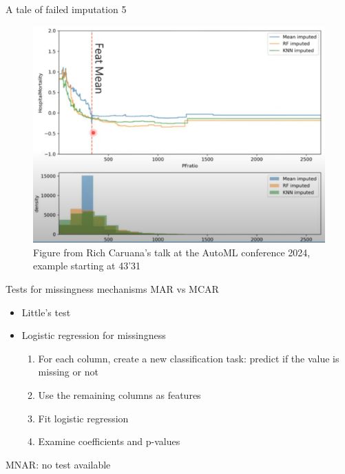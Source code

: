 \documentclass[11pt,compress,t,notes=noshow, aspectratio=169, xcolor=table]{beamer}
\begin{document}
\begin{frame}{A tale of failed imputation 5}
\vfill
\begin{figure}
    \centering
    \includegraphics[width=0.5\linewidth]{slides/07_imputation/figure_man/Screenshot from 2025-06-03 22-39-01.png}
    \caption{Figure from Rich Caruana's talk at the AutoML conference 2024, example starting at 43'31 \href{https://www.youtube.com/watch?v=5mH7Fyy5wQY}{}}
\end{figure}
\vfill
\end{frame}

\begin{frame}{Tests for missingness mechanisms}
\vfill
MAR vs MCAR
\begin{itemize}
    \vfill
    \item Little's test
    \item Logistic regression for missingness
    \begin{enumerate}
        \item For each column, create a new classification task: predict if the value is missing or not
        \item Use the remaining columns as features
        \item Fit logistic regression
        \item Examine coefficients and p-values
    \end{enumerate}
    \vfill
\end{itemize}
MNAR: no test available
\vfill
\end{frame}
\end{document}
